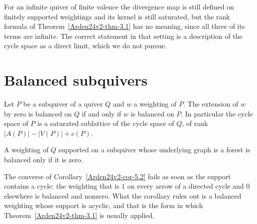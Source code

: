 \begin{remark}\label{Arden24v2-rem-4.2}
\label{Arden24v2-rem:infinite}
For an infinite quiver of finite valence the divergence map is still defined on finitely supported weightings and its kernel is still saturated, but the rank formula of Theorem~\ref{Arden24v2-thm-3.1} has no meaning, since all three of its terms are infinite. The correct statement in that setting is a description of the cycle space as a direct limit, which we do not pursue.
\end{remark}

\section{Balanced subquivers}\label{Arden24v2-sec-5}

\begin{theorem}\label{Arden24v2-thm-5.1}
\label{Arden24v2-thm:subquiver}
Let $P$ be a subquiver of a quiver $Q$ and $w$ a weighting of $P$. The extension of $w$ by zero is balanced on $Q$ if and only if $w$ is balanced on $P$. In particular the cycle space of $P$ is a saturated sublattice of the cycle space of $Q$, of rank $|A(P)| - |V(P)| + c(P)$.
\end{theorem}

\begin{corollary}\label{Arden24v2-cor-5.2}
\label{Arden24v2-cor:subquiver}
A weighting of $Q$ supported on a subquiver whose underlying graph is a forest is balanced only if it is zero.
\end{corollary}

\begin{remark}\label{Arden24v2-rem-5.3}
\label{Arden24v2-rem:local}
The converse of Corollary~\ref{Arden24v2-cor-5.2} fails as soon as the support contains a cycle: the weighting that is $1$ on every arrow of a directed cycle and $0$ elsewhere is balanced and nonzero. What the corollary rules out is a balanced weighting whose support is acyclic, and that is the form in which Theorem~\ref{Arden24v2-thm-3.1} is usually applied.
\end{remark}
